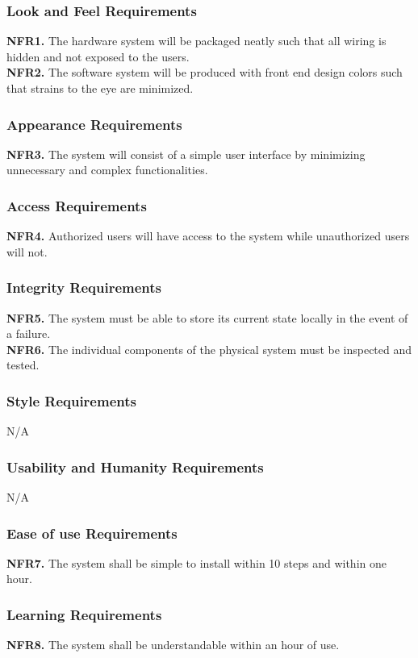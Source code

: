 \documentclass[12pt, titlepage]{article}
\begin{document}
\subsubsection{Look and Feel Requirements}
\textbf{NFR1.} The hardware system will be packaged neatly such that all wiring is hidden and not exposed to the users.\\
\textbf{NFR2.} The software system will be produced with front end design colors such that strains to the eye are minimized.
\subsubsection{Appearance Requirements}
\textbf{NFR3.} The system will consist of a simple user interface by minimizing unnecessary and complex functionalities.

\subsubsection{Access Requirements}
\textbf{NFR4.} Authorized users will have access to the system while unauthorized users will not.

\subsubsection{Integrity Requirements}
\textbf{NFR5.} The system must be able to store its current state locally in the event of a failure.\\
\textbf{NFR6.} The individual components of the physical system must be inspected and tested.

\subsubsection{Style Requirements}
N/A
\subsubsection{Usability and Humanity Requirements}
N/A
\subsubsection{Ease of use Requirements}
\textbf{NFR7.} The system shall be simple to install within 10 steps and within one hour.

\subsubsection{Learning Requirements}
\textbf{NFR8.} The system shall be understandable within an hour of use.
\end{document}
